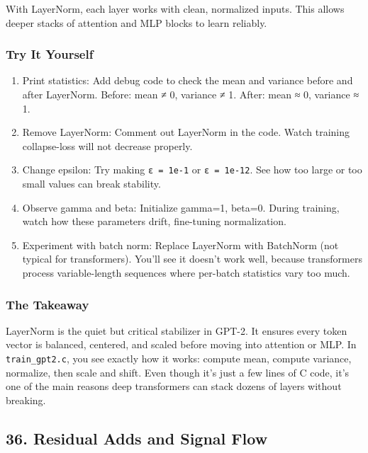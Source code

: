 \documentclass[
  letterpaper,
  DIV=11,
  numbers=noendperiod]{scrreprt}
\providecommand{\tightlist}{%
  \setlength{\itemsep}{0pt}\setlength{\parskip}{0pt}}
\begin{document}
With LayerNorm, each layer works with clean, normalized inputs. This
allows deeper stacks of attention and MLP blocks to learn reliably.

\subsubsection{Try It Yourself}\label{try-it-yourself-24}

\begin{enumerate}
\def\labelenumi{\arabic{enumi}.}
\tightlist
\item
  Print statistics: Add debug code to check the mean and variance before
  and after LayerNorm. Before: mean ≠ 0, variance ≠ 1. After: mean ≈ 0,
  variance ≈ 1.
\item
  Remove LayerNorm: Comment out LayerNorm in the code. Watch training
  collapse-loss will not decrease properly.
\item
  Change epsilon: Try making \texttt{ε\ =\ 1e-1} or
  \texttt{ε\ =\ 1e-12}. See how too large or too small values can break
  stability.
\item
  Observe gamma and beta: Initialize gamma=1, beta=0. During training,
  watch how these parameters drift, fine-tuning normalization.
\item
  Experiment with batch norm: Replace LayerNorm with BatchNorm (not
  typical for transformers). You'll see it doesn't work well, because
  transformers process variable-length sequences where per-batch
  statistics vary too much.
\end{enumerate}

\subsubsection{The Takeaway}\label{the-takeaway-24}

LayerNorm is the quiet but critical stabilizer in GPT-2. It ensures
every token vector is balanced, centered, and scaled before moving into
attention or MLP. In \texttt{train\_gpt2.c}, you see exactly how it
works: compute mean, compute variance, normalize, then scale and shift.
Even though it's just a few lines of C code, it's one of the main
reasons deep transformers can stack dozens of layers without breaking.

\subsection{36. Residual Adds and Signal
Flow}\label{residual-adds-and-signal-flow}
\end{document}
